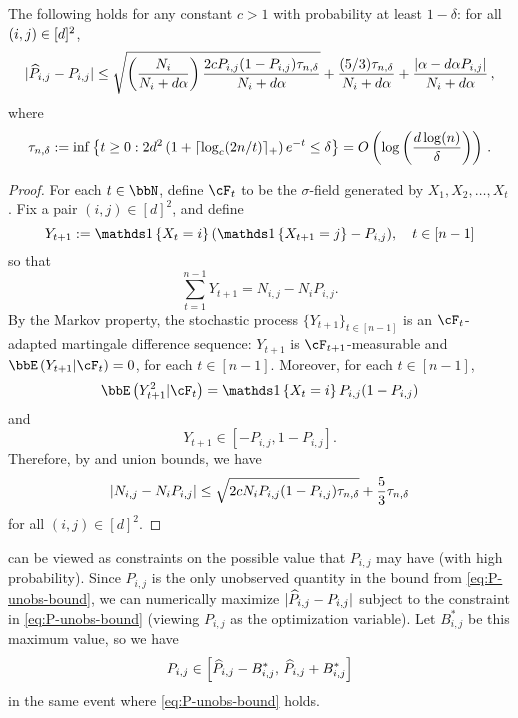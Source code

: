 \begin{lemma}
  \label{lem:P-unobs-bound}
  The following holds for any constant $c>1$ with probability at least
  $1-\delta$: for all $(i,j) \in [d]^2$,
  \begin{equation}
    | \widehat{P}_{i,j} - P_{i,j} |
    \leq
    \sqrt{\left(\frac{N_i}{N_i+d\alpha}\right)\frac{2cP_{i,j}(1-P_{i,j})\tau_{n,\delta}}{N_i+d\alpha}}
    + \frac{(5/3)\tau_{n,\delta}}{N_i+d\alpha}
    + \frac{|\alpha-d\alpha P_{i,j}|}{N_i+d\alpha}\,,
    \label{eq:P-unobs-bound}
  \end{equation}
  where
  \begin{equation}
    \tau_{n,\delta}
    := \inf
    \left\{
      t\geq0 :
      2d^2 \left( 1 + \lceil\log_c(2n/t)\rceil_+ \right) e^{-t} \leq \delta
    \right\}
    = O\left( \log\left( \frac{d\log(n)}{\delta} \right) \right)
    \,.
    \label{eq:emptail}
  \end{equation}
\end{lemma}
\begin{proof}
  For each $t \in \bbN$, define $\cF_t$ to be the $\sigma$-field
  generated by $X_1,X_2,\dotsc,X_t$.
  Fix a pair $(i,j) \in [d]^2$, and define
  \[
    Y_{t+1} := \Ind{X_t = i} (\Ind{X_{t+1}=j} - P_{i,j})
    , \quad t \in [n-1]
  \]
  so that
  \[
    \sum_{t=1}^{n-1} Y_{t+1}
    = N_{i,j} - N_i P_{i,j}
    .
  \]
  By the Markov property, the stochastic process $\{ Y_{t+1} \}_{t \in
  [n-1]}$ is an $\cF_t$-adapted martingale difference sequence:
  $Y_{t+1}$ is $\cF_{t+1}$-measurable and $\EE{Y_{t+1}| \cF_t } = 0$,
  for each $t \in [n-1]$.
  Moreover, for each $t \in [n-1]$,
  \[
    \EE{Y_{t+1}^2| \cF_t } = \Ind{X_t=i} P_{i,j} (1-P_{i,j})
  \]
  and
  \[
    Y_{t+1} \in [-P_{i,j},1-P_{i,j}] .
  \]
  Therefore, by  and union bounds, we have
  \[
    | N_{i,j} - N_i P_{i,j} |
    \leq \sqrt{2c N_i P_{i,j} (1-P_{i,j}) \tau_{n,\delta}} + \frac53
    \tau_{n,\delta}
  \]
  for all $(i,j) \in [d]^2$.
\end{proof}

 can be viewed as constraints on the possible
value that $P_{i,j}$ may have (with high probability).
Since $P_{i,j}$ is the only unobserved quantity in the bound from
\cref{eq:P-unobs-bound}, we can numerically maximize $|\widehat{P}_{i,j} -
P_{i,j}|$ subject to the constraint in \cref{eq:P-unobs-bound}
(viewing $P_{i,j}$ as the optimization variable).
Let $B_{i,j}^*$ be this maximum value, so we have
\[
  P_{i,j} \in
  \left[
    \widehat{P}_{i,j} - B_{i,j}^*,\,
    \widehat{P}_{i,j} + B_{i,j}^*
  \right]
\]
in the same event where \cref{eq:P-unobs-bound} holds.

